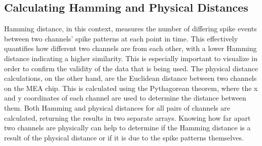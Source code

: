 \documentclass{article} %
\begin{document}
\subsection{Calculating Hamming and Physical Distances}

Hamming distance, in this context, measures the number of differing spike events between two channels' spike patterns at each point in time. This effectively quantifies how different two channels are from each other, with a lower Hamming distance indicating a higher similarity. This is especially important to visualize in order to confirm the validity of the data that is being used. The physical distance calculations, on the other hand, are the Euclidean distance between two channels on the MEA chip. This is calculated using the Pythagorean theorem, where the x and y coordinates of each channel are used to determine the distance between them. Both Hamming and physical distances for all pairs of channels are calculated, returning the results in two separate arrays. Knowing how far apart two channels are physically can help to determine if the Hamming distance is a result of the physical distance or if it is due to the spike patterns themselves.
\end{document}

